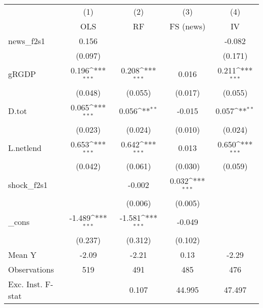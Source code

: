 {
\def\sym#1{\ifmmode^{#1}\else\(^{#1}\)\fi}
\begin{tabular}{l*{4}{c}}
\toprule
            &\multicolumn{1}{c}{(1)}&\multicolumn{1}{c}{(2)}&\multicolumn{1}{c}{(3)}&\multicolumn{1}{c}{(4)}\\
            &\multicolumn{1}{c}{OLS}&\multicolumn{1}{c}{RF}&\multicolumn{1}{c}{FS (news)}&\multicolumn{1}{c}{IV}\\
\midrule
news\_f2s1   &       0.156         &                     &                     &      -0.082         \\
            &     (0.097)         &                     &                     &     (0.171)         \\
\addlinespace
gRGDP       &       0.196\sym{***}&       0.208\sym{***}&       0.016         &       0.211\sym{***}\\
            &     (0.048)         &     (0.055)         &     (0.017)         &     (0.055)         \\
\addlinespace
D.tot       &       0.065\sym{***}&       0.056\sym{**} &      -0.015         &       0.057\sym{**} \\
            &     (0.023)         &     (0.024)         &     (0.010)         &     (0.024)         \\
\addlinespace
L.netlend   &       0.653\sym{***}&       0.642\sym{***}&       0.013         &       0.650\sym{***}\\
            &     (0.042)         &     (0.061)         &     (0.030)         &     (0.059)         \\
\addlinespace
shock\_f2s1  &                     &      -0.002         &       0.032\sym{***}&                     \\
            &                     &     (0.006)         &     (0.005)         &                     \\
\addlinespace
\_cons      &      -1.489\sym{***}&      -1.581\sym{***}&      -0.049         &                     \\
            &     (0.237)         &     (0.312)         &     (0.102)         &                     \\
\midrule
Mean Y      &       -2.09         &       -2.21         &        0.13         &       -2.29         \\
Observations&         519         &         491         &         485         &         476         \\
Exc. Inst. F-stat&                     &       0.107         &      44.995         &      47.497         \\
\bottomrule
\end{tabular}
}
